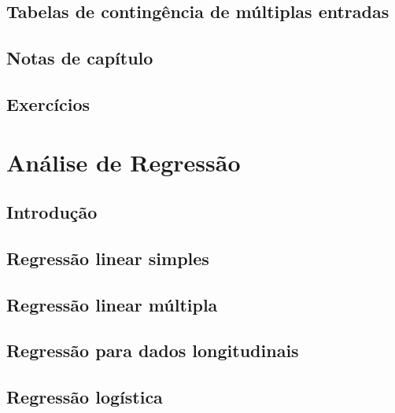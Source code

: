 \documentclass[
]{latex/krantz}
\theoremstyle{definition}
\theoremstyle{definition}
\theoremstyle{definition}
\theoremstyle{definition}
\theoremstyle{remark}
\begin{document}
\hypertarget{tabelas-de-continguxeancia-de-muxfaltiplas-entradas}{%
\section{Tabelas de contingência de múltiplas entradas}\label{tabelas-de-continguxeancia-de-muxfaltiplas-entradas}}

\hypertarget{notas-de-capuxedtulo-3}{%
\section{Notas de capítulo}\label{notas-de-capuxedtulo-3}}

\hypertarget{exercuxedcios-3}{%
\section{Exercícios}\label{exercuxedcios-3}}

\hypertarget{anuxe1lise-de-regressuxe3o}{%
\chapter{Análise de Regressão}\label{anuxe1lise-de-regressuxe3o}}

\hypertarget{introduuxe7uxe3o-4}{%
\section{Introdução}\label{introduuxe7uxe3o-4}}

\hypertarget{regressuxe3o-linear-simples}{%
\section{Regressão linear simples}\label{regressuxe3o-linear-simples}}

\hypertarget{regressuxe3o-linear-muxfaltipla}{%
\section{Regressão linear múltipla}\label{regressuxe3o-linear-muxfaltipla}}

\hypertarget{regressuxe3o-para-dados-longitudinais}{%
\section{Regressão para dados longitudinais}\label{regressuxe3o-para-dados-longitudinais}}

\hypertarget{regressuxe3o-loguxedstica}{%
\section{Regressão logística}\label{regressuxe3o-loguxedstica}}
\end{document}
